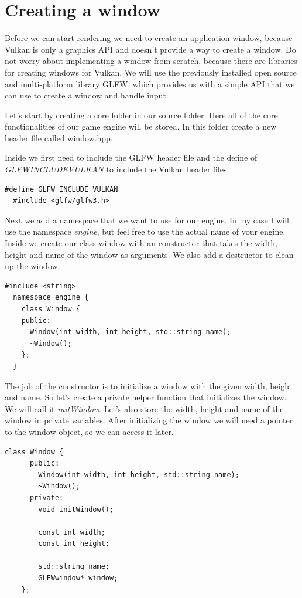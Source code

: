\documentclass[12pt]{report} \usepackage{preamble}
\begin{document}
\section{Creating a window}

Before we can start rendering we need to create an application window,
because Vulkan is only a graphics API and doesn't provide a way to create a window.
Do not worry about implementing a window from scratch,
because there are libraries for creating windows for Vulkan. We will use the
previously installed open source and multi-platform library \ac{GLFW},
which provides us with a simple \ac{API} that we can use to create a window and handle input. \cite{glfw}

Let's start by creating a core folder in our source folder. Here all of the core functionalities
of our game engine will be stored. In this folder create a new header file called window.hpp.

Inside we first need to include the \ac{GLFW} header file and the define of \\
\textit{GLFW\textunderscore INCLUDE\textunderscore VULKAN} to include the Vulkan header files.

\begin{lstlisting}[Language=C++]
  #define GLFW_INCLUDE_VULKAN
  #include <glfw/glfw3.h>
\end{lstlisting}

Next we add a namespace that we want to use for our engine. In my case I will use
the namespace \textit{engine}, but feel free to use the actual name of your engine.
Inside we create our class window with an constructor that takes the width, height
and name of the window as arguments. We also add a destructor to clean up the window.

\begin{lstlisting}[Language=C++]
  #include <string>
  namespace engine {
    class Window {
    public:
      Window(int width, int height, std::string name);
      ~Window();
    };
  }
\end{lstlisting}

The job of the constructor is to initialize a window with the given width, height and name.
So let's create a private helper function that initializes the window. We will call it
\textit{initWindow}. Let's also store the width, height and name of the window in private variables.
After initializing the window we will need a pointer to the window object, so we can access it later.

\begin{lstlisting}[Language=C++]
  class Window {
      public:
        Window(int width, int height, std::string name);
        ~Window();
      private:
        void initWindow();
      
        const int width;
        const int height;
      
        std::string name;
        GLFWwindow* window;
    };
\end{lstlisting}
\end{document}
